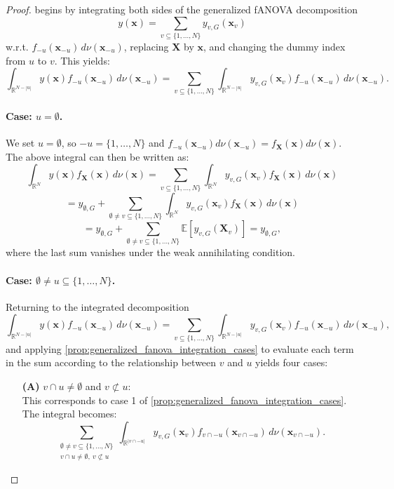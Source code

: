 \begin{proof}
\citet{rahman2014} begins by integrating both sides of the generalized fANOVA decomposition
\[
y(\boldsymbol{x}) = \sum_{v \subseteq \{1,\dots,N\}} y_{v,G}(\boldsymbol{x}_v)
\]
w.r.t. $f_{-u}(\boldsymbol{x}_{-u})\, d \nu(\boldsymbol{x}_{-u})$, replacing $\boldsymbol{X}$ by $\boldsymbol{x}$, and changing the dummy index from $u$ to $v$. This yields:
\[
\int_{\mathbb{R}^{N - |u|}} y(\boldsymbol{x}) f_{-u}(\boldsymbol{x}_{-u}) \, d \nu(\boldsymbol{x}_{-u})
= \sum_{v \subseteq \{1,\dots,N\}} \int_{\mathbb{R}^{N - |u|}} y_{v,G}(\boldsymbol{x}_v) f_{-u}(\boldsymbol{x}_{-u}) \, d \nu(\boldsymbol{x}_{-u}).
\]
\paragraph{Case: \( u = \emptyset \).}
We set $u = \emptyset$, so $-u = \{1,\dots,N\}$ and $f_{-u}(\boldsymbol{x}_{-u}) d \nu(\boldsymbol{x}_{-u}) = f_{\boldsymbol{X}}(\boldsymbol{x}) d \nu(\boldsymbol{x})$. The above integral can then be written as:
\[
\int_{\mathbb{R}^N} y(\boldsymbol{x}) f_{\boldsymbol{X}}(\boldsymbol{x}) \, d \nu(\boldsymbol{x})
= \sum_{v \subseteq \{1,\dots,N\}} \int_{\mathbb{R}^N} y_{v,G}(\boldsymbol{x}_v) f_{\boldsymbol{X}}(\boldsymbol{x}) \, d \nu(\boldsymbol{x})
\]
\[
= y_{\emptyset,G}
+ \sum_{\emptyset \ne v \subseteq \{1,\dots,N\}} \int_{\mathbb{R}^N} y_{v,G}(\boldsymbol{x}_v) f_{\boldsymbol{X}}(\boldsymbol{x}) \, d \nu(\boldsymbol{x})
\]
\[
= y_{\emptyset,G} + \sum_{\emptyset \ne v \subseteq \{1,\dots,N\}} \mathbb{E}[y_{v,G}(\boldsymbol{X}_v)] = y_{\emptyset,G},
\]
where the last sum vanishes under the weak annihilating condition.

\paragraph{Case: \( \emptyset \ne u \subseteq \{1,\dots,N\} \).}
Returning to the integrated decomposition
\[
\int_{\mathbb{R}^{N - |u|}} y(\boldsymbol{x}) f_{-u}(\boldsymbol{x}_{-u}) \, d \nu(\boldsymbol{x}_{-u})
= \sum_{v \subseteq \{1,\dots,N\}} \int_{\mathbb{R}^{N - |u|}} y_{v,G}(\boldsymbol{x}_v) f_{-u}(\boldsymbol{x}_{-u}) \, d \nu(\boldsymbol{x}_{-u}),
\]
and applying \autoref{prop:generalized_fanova_integration_cases} to evaluate each term in the sum according to the relationship between $v$ and $u$ yields four cases:

\begin{itemize}
  \item[\textbf{(A)}] \( v \cap u \ne \emptyset \) and \( v \not\subset u \): \\
  This corresponds to case 1 of \autoref{prop:generalized_fanova_integration_cases}. The integral becomes:
  \[
  \sum_{\substack{\emptyset \ne v \subseteq \{1,\dots,N\} \\ v \cap u \ne \emptyset,\ v \not\subset u}} 
  \int_{\mathbb{R}^{|v \cap -u|}} y_{v,G}(\boldsymbol{x}_v) f_{v \cap -u}(\boldsymbol{x}_{v \cap -u}) \, d \nu(\boldsymbol{x}_{v \cap -u}).
  \]


\end{itemize}
\end{proof}
